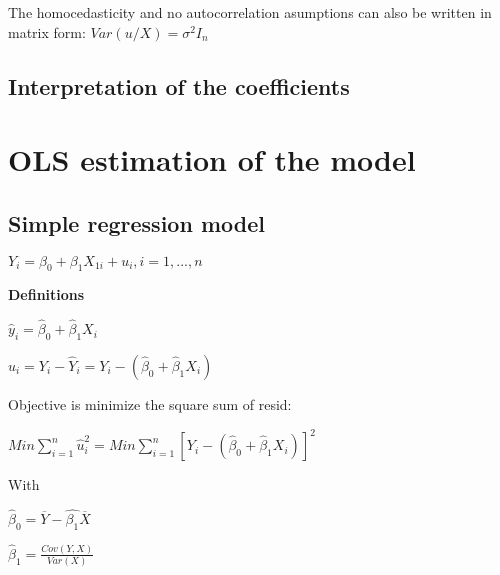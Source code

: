 \documentclass[10pt,landscape]{article}
\begin{document}
\begin{multicols}{3}
The homocedasticity and no autocorrelation asumptions can also be written in matrix form: $Var(u / X) = \sigma^2 I_n$

\subsection*{Interpretation of the coefficients}

\section*{OLS estimation of the model}

\subsection*{Simple regression model}

$Y_i = \beta_0 + \beta_1 X_{1i} + u_i, i = 1, ..., n$

\textbf{Definitions}

$\hat{y}_i = \hat{\beta}_0 + \hat{\beta}_1 X_i$

$\hat{u}_i = Y_i - \hat{Y}_i = Y_i - (\hat{\beta}_0 + \hat{\beta}_1 X_i)$

Objective is minimize the square sum of resid:

$Min \sum_{i=1}^n \hat{u}_i^2 = Min \sum_{i=1}^n [Y_i - (\hat{\beta}_0 + \hat{\beta}_1 X_i)]^2$

With

$\hat{\beta}_0 = \overline{Y} - \hat{\beta_1} \overline{X}$

$\hat{\beta}_1 = \frac{Cov(Y, X)}{Var(X)}$


\end{multicols}
\end{document}
